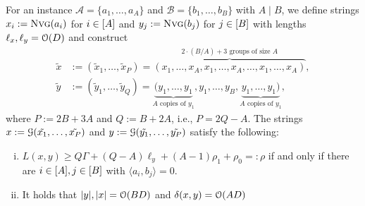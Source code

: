 \begin{lemma}
\label{lem:large_lcs_reduce}
For an \ov{} instance $\mathcal{A} = \{a_1, \ldots, a_A\}$ and $\mathcal{B} = \{b_1, \ldots, b_B\}$ with $A \mid B$, we define strings $x_i := \text{\textsc{Nvg}}(a_i)$ for $i \in [A]$ and $y_j := \text{\textsc{Nvg}}(b_j)$ for $j \in [B]$ with lengths $\ell_x, \ell_y = \mathcal{O}(D)$ and construct
\begin{align*}
\tilde{x} &:= (\tilde{x}_1, \ldots, \tilde{x}_P) 
= \overbrace{\left(x_1, \ldots, x_A, x_1, \ldots, x_A, \ldots, x_1, \ldots, x_A\right)}^{\text{$2\cdot(B/A)+3$ groups of size $A$}} 
, \\
\tilde{y} &:= (\tilde{y}_1, \ldots, \tilde{y}_Q) 
= \underbrace{(y_1, \ldots, y_1}_{\text{$A$ copies of $y_1$}},
y_1, \ldots, y_B, 
\underbrace{y_1, \ldots, y_1)}_{\text{$A$ copies of $y_1$}}
,
\end{align*}
where $P := 2B + 3A$ and $Q := B + 2A$, i.e., $P = 2Q - A$. The strings $x := \mathcal{G}(\tilde{x_1}, \ldots, \tilde{x_P})$ and $y := \mathcal{G}(\tilde{y_1}, \ldots, \tilde{y_P})$ satisfy the following:

\begin{enumerate}[(i)]
\item\label{lem:large_lcs_reduce:infer}
$L(x,y) \geq Q\Gamma + (Q-A)\ell_y + (A-1)\rho_1 + \rho_0 =: \rho$ if and only if there are $i \in [A], j \in [B]$ with $\langle a_i, b_j \rangle = 0$.
%
\item\label{lem:large_lcs_reduce:size}
It holds that $|y|, |x| = \mathcal{O}(BD)$ and $\delta(x,y) = \mathcal{O}(AD)$
\end{enumerate}
\end{lemma}

